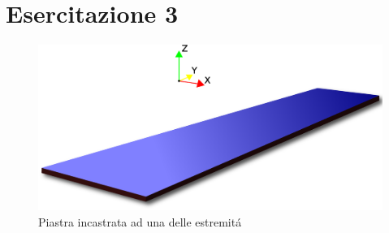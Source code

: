 \documentclass{article}
\begin{document}
        \section{Esercitazione 3 \label{Esercitazione_3}}

            \begin{figure}[h!]
                \includegraphics[width=\textwidth]{MUL2/Esercitazione3/plank.eps}
                \caption{Piastra incastrata ad una delle estremitá}
            \end{figure}

        

        \clearpage
        \printbibliography
\end{document}
